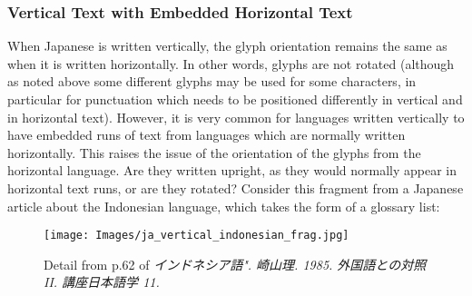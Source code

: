 \subsubsection[{Vertical Text with Embedded Horizontal Text}]{Vertical Text with Embedded Horizontal Text}\label{WDWMEG2}\par
When Japanese is written vertically, the glyph orientation remains the same as when it is written horizontally. In other words, glyphs are not rotated (although as noted above some different glyphs may be used for some characters, in particular for punctuation which needs to be positioned differently in vertical and in horizontal text). However, it is very common for languages written vertically to have embedded runs of text from languages which are normally written horizontally. This raises the issue of the orientation of the glyphs from the horizontal language. Are they written upright, as they would normally appear in horizontal text runs, or are they rotated? Consider this fragment from a Japanese article about the Indonesian language, which takes the form of a glossary list: \par
\begin{figure}[htbp]
\noindent\noindent\texttt{[image: Images/ja\_vertical\_indonesian\_frag.jpg]}
\caption{Detail from p.62 of \textit{インドネシア語". 崎山理. 1985. 外国語との対照 II. 講座日本語学 11.}}\end{figure}
\par
